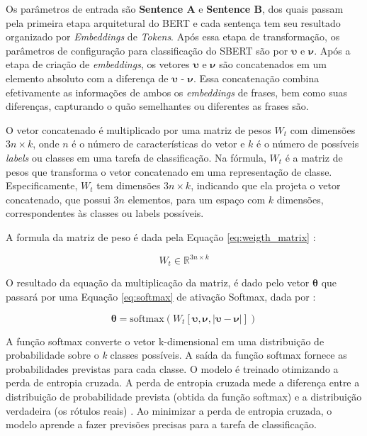 Os parâmetros de entrada são \textbf{Sentence A} e \textbf{Sentence B}, dos quais passam pela primeira etapa arquitetural do BERT e cada sentença tem seu resultado organizado por \textit{Embeddings} de \textit{Tokens}.
Após essa etapa de transformação, os parâmetros de configuração para classificação do SBERT são por \(\boldsymbol{\upsilon}\) e \(\boldsymbol{\nu}\).
Após a etapa de criação de \textit{embeddings}, os vetores \(\boldsymbol{\upsilon}\) e  \(\boldsymbol{\nu}\) são concatenados em um elemento absoluto com a diferença de  \(\boldsymbol{\upsilon}\) - \(\boldsymbol{\nu}\). Essa concatenação combina efetivamente as informações de ambos os \textit{embeddings} de frases, bem como suas diferenças, capturando o quão semelhantes ou diferentes as frases são.

O vetor concatenado é multiplicado por uma matriz de pesos \( W_t \) com dimensões \( 3n \times k \), onde \( n \) é o número de características do vetor e \( k \) é o número de possíveis \textit{labels} ou classes em uma tarefa de classificação. Na fórmula, \( W_t \) é a matriz de pesos que transforma o vetor concatenado em uma representação de classe. Especificamente, \( W_t \) tem dimensões \( 3n \times k \), indicando que ela projeta o vetor concatenado, que possui \( 3n \) elementos, para um espaço com \( k \) dimensões, correspondentes às classes ou labels possíveis.


A formula da matriz de peso é dada pela Equação \ref{eq:weigth_matrix} \cite{reimers2019sentencebertsentenceembeddingsusing}: 

\begin{equation}
    \label{eq:weigth_matrix}
   W_t \in \mathbb{R}^{3n \times k}
\end{equation}

O resultado da equação da multiplicação da matriz, é dado pelo vetor  \(\boldsymbol{\theta}\) que passará por uma Equação \ref{eq:softmax} de ativação Softmax, dada por \cite{reimers2019sentencebertsentenceembeddingsusing}:

\begin{equation}
    \label{eq:softmax}
    \boldsymbol{\theta} = \text{softmax}(W_t [\boldsymbol{\upsilon}, \boldsymbol{\nu}, |\boldsymbol{\upsilon} - \boldsymbol{\nu}|])
\end{equation}

A função softmax converte o vetor k-dimensional em uma distribuição de probabilidade sobre o \textit{k} classes possíveis. A saída da função softmax fornece as probabilidades previstas para cada classe.
O modelo é treinado otimizando a perda de entropia cruzada. A perda de entropia cruzada mede a diferença entre a distribuição de probabilidade prevista (obtida da função softmax) e a distribuição verdadeira (os rótulos reais)
\cite{reimers2019sentencebertsentenceembeddingsusing}.
Ao minimizar a perda de entropia cruzada, o modelo aprende a fazer previsões precisas para a tarefa de classificação.


